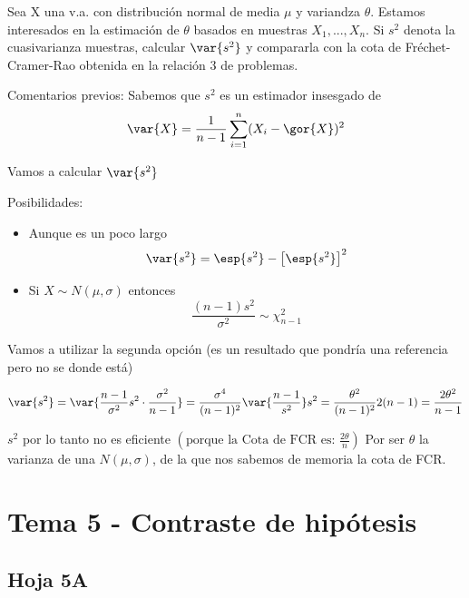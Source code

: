 \begin{problem}[9]
Sea X una v.a. con distribución normal de media $\mu$ y variandza $\theta$. Estamos interesados en la estimación de $\theta$ basados en muestras $X_1,...,X_n$. Si $s^2$ denota la cuasivarianza muestras, calcular $\var{s^2}$ y compararla con la cota de Fréchet-Cramer-Rao obtenida en la relación 3 de problemas.
\solution

Comentarios previos: Sabemos que $s^2$ es un estimador insesgado de \[\var{X} = \frac{1}{n-1} \sum_{i=1}^n (X_i - \gor{X})^2\]

Vamos a calcular $\var{s^2}$

Posibilidades:
\begin{itemize}
\item Aunque es un poco largo\[
\var{s^2} = \esp{s^2}-\left[\esp{s^2}\right]^2
\]

\item Si $X\sim N(\mu,\sigma)$ entonces \[\frac{(n-1)s^2}{\sigma^2} \sim \chi_{n-1}^2\]
\end{itemize}

Vamos a utilizar la segunda opción (es un resultado que pondría una referencia pero no se donde está)

\[
\var{s^2} = \var{\frac{n-1}{\sigma^2}s^2\cdot\frac{\sigma^2}{n-1}} = \frac{\sigma^4}{(n-1)^2} \var{\frac{n-1}{s^2}} s^2 = \frac{\theta^2}{(n-1)^2}2(n-1) = \frac{2\theta^2}{n-1} \]

$s^2$ por lo tanto no es eficiente $\left( \text{porque la Cota de FCR es: } \displaystyle\frac{2\theta}{n}\right)$ Por ser $\theta$ la varianza de una $N(\mu,\sigma)$, de la que nos sabemos de memoria la cota de FCR.

\end{problem}

\newpage
\section{Tema 5 - Contraste de hipótesis}
\subsection{Hoja 5A}

